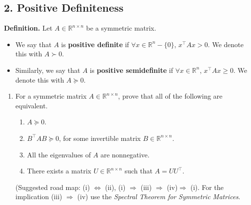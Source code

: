 \documentclass{article}
\newcommand{\R}{\mathbb{R}}
\begin{document}
\subsection*{2. Positive Definiteness} 
\textbf{Definition.} Let $A \in \mathbb{R}^{n \times n}$ be a symmetric matrix. 
\begin{itemize}
    \item We say that $A$ is \textbf{positive definite} if $\forall x \in \mathbb{R}^n - \{0\}$, $x^{\top}Ax > 0$. We denote this with $A \succ 0$. 
    \item Similarly, we say that $A$ is \textbf{positive semidefinite} if $\forall x \in \R^n$, $x^{\top}Ax \geq 0$. We denote this with $A \succeq 0$. 
\end{itemize}
\begin{enumerate}[label=(\alph*)]
    \item For a symmetric matrix $A \in \R^{n\times n}$, prove that all of the following are equivalent. 
    \begin{enumerate}[label=(\roman*)]
        \item $A \succeq 0$. 
        \item $B^{\top} AB \succeq 0$, for some invertible matrix $B \in \R^{n\times n}$. 
        \item All the eigenvalues of $A$ are nonnegative. 
        \item There exists a matrix $U \in \R^{n\times n}$ such that $A = U U^{\top}$. 
    \end{enumerate}

    (Suggested road map: (i) $\Leftrightarrow$ (ii), (i) $\Rightarrow$ (iii) $\Rightarrow$ (iv)$ \Rightarrow$ (i). For the implication (iii) $\Rightarrow$ (iv) use the \emph{Spectral Theorem for Symmetric Matrices}. 
    

\end{enumerate}
\end{document}
